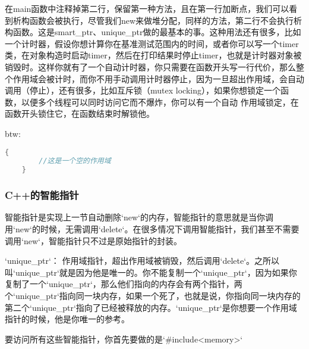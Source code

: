 在{\ncodestyle main}函数中注释掉第二行，保留第一种方法，且在第一行加断点，我们可以看到析构函数会被执行，尽管我们{\ncodestyle new}来做堆分配，同样的方法，第二行不会执行析构函数。这是{\ncodestyle smart_ptr}、{\ncodestyle unique_ptr}做的最基本的事。这种用法还有很多，比如一个计时器，假设你想计算你在基准测试范围内的时间，或者你可以写一个timer类，在对象构造时启动{\ncodestyle timer}，然后在打印结果时停止{\ncodestyle timer}，也就是计时器对象被销毁时。这样你就有了一个自动计时器，你只需要在函数开头写一行代价，那么整个作用域会被计时，而你不用手动调用计时器停止，因为一旦超出作用域，会自动调用（停止），还有很多，比如互斥锁（mutex locking），如果你想锁定一个函数，以便多个线程可以同时访问它而不爆炸，你可以有一个自动 作用域锁定，在函数开头锁住它，在函数结束时解锁他。

btw:

\begin{lstlisting}[language=c++]
    {
        //这是一个空的作用域
    }
\end{lstlisting}

\subsubsection{C++的智能指针}


智能指针是实现上一节自动删除`new`的内存，智能指针的意思就是当你调用`new`的时候，无需调用`delete`。在很多情况下调用智能指针，我们甚至不需要调用`new`，智能指针只不过是原始指针的封装。

`unique_ptr`：
作用域指针，超出作用域被销毁，然后调用`delete`。之所以叫`unique_ptr`就是因为他是唯一的。你不能复制一个`unique_ptr`，因为如果你复制了一个`unique_ptr`，那么他们指向的内存会有两个指针，两个`unique_ptr`指向同一块内存，如果一个死了，也就是说，你指向同一块内存的第二个`unique_ptr`指向了已经被释放的内存。`unique_ptr`是你想要一个作用域指针的时候，他是你唯一的参考。

要访问所有这些智能指针，你首先要做的是`\#include<memory>`

